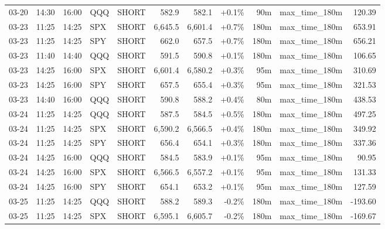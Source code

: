 \documentclass[11pt,a4paper,twoside]{article}
\begin{document}
\begin{center}
\begin{longtable}{>{\color{txtmain}}l l l l l r r r r >{\color{txtmain}}l r}
03-20 & 14:30 & 16:00 & QQQ & SHORT & 582.9 & 582.1 & \textcolor{wingreen}{+0.1\%} & 90m & max\_time\_180m & \textcolor{wingreen}{120.39} \\
03-23 & 11:25 & 14:25 & SPX & SHORT & 6,645.5 & 6,601.4 & \textcolor{wingreen}{+0.7\%} & 180m & max\_time\_180m & \textcolor{wingreen}{653.91} \\
03-23 & 11:25 & 14:25 & SPY & SHORT & 662.0 & 657.5 & \textcolor{wingreen}{+0.7\%} & 180m & max\_time\_180m & \textcolor{wingreen}{656.21} \\
03-23 & 11:40 & 14:40 & QQQ & SHORT & 591.5 & 590.8 & \textcolor{wingreen}{+0.1\%} & 180m & max\_time\_180m & \textcolor{wingreen}{106.65} \\
03-23 & 14:25 & 16:00 & SPX & SHORT & 6,601.4 & 6,580.2 & \textcolor{wingreen}{+0.3\%} & 95m & max\_time\_180m & \textcolor{wingreen}{310.69} \\
03-23 & 14:25 & 16:00 & SPY & SHORT & 657.5 & 655.4 & \textcolor{wingreen}{+0.3\%} & 95m & max\_time\_180m & \textcolor{wingreen}{321.53} \\
03-23 & 14:40 & 16:00 & QQQ & SHORT & 590.8 & 588.2 & \textcolor{wingreen}{+0.4\%} & 80m & max\_time\_180m & \textcolor{wingreen}{438.53} \\
03-24 & 11:25 & 14:25 & QQQ & SHORT & 587.5 & 584.5 & \textcolor{wingreen}{+0.5\%} & 180m & max\_time\_180m & \textcolor{wingreen}{497.25} \\
03-24 & 11:25 & 14:25 & SPX & SHORT & 6,590.2 & 6,566.5 & \textcolor{wingreen}{+0.4\%} & 180m & max\_time\_180m & \textcolor{wingreen}{349.92} \\
03-24 & 11:25 & 14:25 & SPY & SHORT & 656.4 & 654.1 & \textcolor{wingreen}{+0.3\%} & 180m & max\_time\_180m & \textcolor{wingreen}{337.36} \\
03-24 & 14:25 & 16:00 & QQQ & SHORT & 584.5 & 583.9 & \textcolor{wingreen}{+0.1\%} & 95m & max\_time\_180m & \textcolor{wingreen}{90.95} \\
03-24 & 14:25 & 16:00 & SPX & SHORT & 6,566.5 & 6,557.2 & \textcolor{wingreen}{+0.1\%} & 95m & max\_time\_180m & \textcolor{wingreen}{131.33} \\
03-24 & 14:25 & 16:00 & SPY & SHORT & 654.1 & 653.2 & \textcolor{wingreen}{+0.1\%} & 95m & max\_time\_180m & \textcolor{wingreen}{127.59} \\
03-25 & 11:25 & 14:25 & QQQ & SHORT & 588.2 & 589.3 & \textcolor{lossred}{-0.2\%} & 180m & max\_time\_180m & \textcolor{lossred}{-193.60} \\
03-25 & 11:25 & 14:25 & SPX & SHORT & 6,595.1 & 6,605.7 & \textcolor{lossred}{-0.2\%} & 180m & max\_time\_180m & \textcolor{lossred}{-169.67} \\

\end{longtable}
\end{center}
\end{document}

